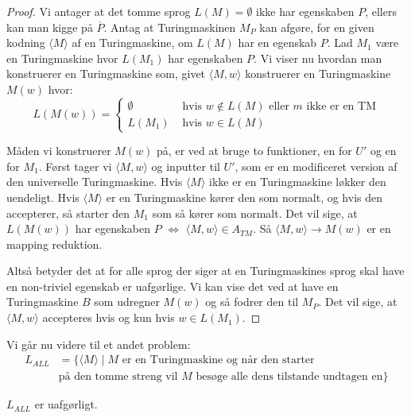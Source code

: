 \begin{proof}
	Vi antager at det tomme sprog $L(M) = \emptyset$ ikke har egenskaben $P$, ellers kan man kigge på $\overline{P}$.
	Antag at Turingmaskinen $M_{P}$ kan afgøre, for en given kodning $\langle M \rangle $ af en Turingmaskine, om $L(M)$ har en egenskab $P$. Lad $M_{1}$ være en Turingmaskine hvor $L(M_{1})$ har egenskaben $P$. Vi viser nu hvordan man konstruerer en Turingmaskine som, givet \(\langle M, w \rangle \) konstruerer en Turingmaskine $M(w)$ hvor:
	\begin{equation*}
		L(M(w)) = \begin{cases}
			\emptyset & \text{ hvis } w \notin L(M) \text{ eller } m \text{ ikke er en TM} \\
			L(M_{1})  & \text{ hvis } w \in L(M)
		\end{cases}
	\end{equation*}

	Måden vi konstruerer $M(w)$ på, er ved at bruge to funktioner, en for $U'$ og en for $M_{1}$. Først tager vi \(\langle M, w \rangle \) og inputter til $U'$, som er en modificeret version af den universelle Turingmaskine. Hvis \(\langle M \rangle \) ikke er en Turingmaskine løkker den uendeligt. Hvis \(\langle M \rangle \) er en Turingmaskine kører den som normalt, og hvis den accepterer, så starter den $M_{1}$ som så kører som normalt. Det vil sige, at $L(M(w))$ har egenskaben $P$ $\iff$ $\langle M , w \rangle \in A_{TM}$. Så $\langle M, w \rangle \longrightarrow M(w)$ er en mapping reduktion.

	Altså betyder det at for alle sprog der siger at en Turingmaskines sprog skal have en non-triviel egenskab er uafgørlige. Vi kan vise det ved at have en Turingmaskine $B$ som udregner $M(w)$ og så fodrer den til $M_{P}$. Det vil sige, at \(\langle M , w \rangle \) accepteres hvis og kun hvis $w \in L(M_{1})$.
\end{proof}

Vi går nu videre til et andet problem:
\begin{align*}
	L_{ALL} & = \{ \langle M \rangle \mid M \text{ er en Turingmaskine og når den starter}       \\
	        & \text{på den tomme streng vil } M \text{ besøge alle dens tilstande undtagen en}\}
\end{align*}

\begin{theorem}
	$L_{ALL}$ er uafgørligt.
\end{theorem}

